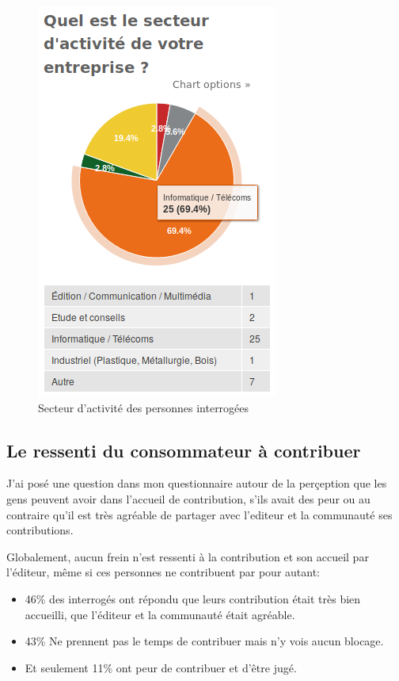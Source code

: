 		\begin{figure}[h]
			\center
			\includegraphics[scale=0.58]{./img/a1}
			\caption{Secteur d'activité des personnes interrogées}
		\end{figure}

		\newpage

		\subsection{Le ressenti du consommateur à contribuer}

		J'ai posé une question dans mon questionnaire autour de la perçeption que les gens peuvent avoir dans l'accueil de contribution, s'ils avait des peur ou au contraire qu'il est très agréable de partager avec l'editeur et la communauté ses contributions.

		Globalement, aucun frein n'est ressenti à la contribution et son accueil par l'éditeur, même si ces personnes ne contribuent par pour autant:

		\begin{itemize}[label=\textbullet, font=\LARGE \color{burntorange}]
			\item 46\% des interrogés ont répondu que leurs contribution était très bien accueilli, que l'éditeur et la communauté était agréable.
			\item 43\% Ne prennent pas le temps de contribuer mais n'y vois aucun blocage.
			\item Et seulement 11\% ont peur de contribuer et d'être jugé.
		\end{itemize}

